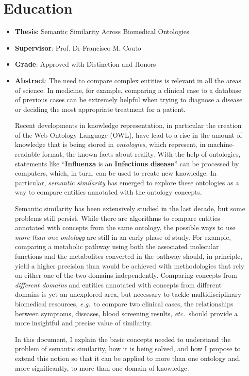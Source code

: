 \section{Education} \label{sec:education}

\begin{itemize}
  \item \textbf{Thesis}: Semantic Similarity Across Biomedical Ontologies
  \item \textbf{Supervisor}: Prof. Dr Francisco M. Couto
  \item \textbf{Grade}: Approved with Distinction and Honors
  \item \textbf{Abstract}: The need to compare complex entities is relevant in all the areas of science. In medicine, for example, comparing a clinical case to a database of previous cases can be extremely helpful when trying to diagnose a disease or deciding the most appropriate treatment for a patient.
  
  \hskip20pt Recent developments in knowledge representation, in particular the creation of the Web Ontology Language (OWL), have lead to a rise in the amount of knowledge that is being stored in \emph{ontologies}, which represent, in machine-readable format, the known facts about reality. With the help of ontologies, statements like ``\textbf{Influenza} is an \textbf{Infectious disease}'' can be processed by computers, which, in turn, can be used to create new knowledge. In particular, \emph{semantic similarity} has emerged to explore these ontologies as a way to compare entities annotated with the ontology concepts.
  
  \hskip20pt Semantic similarity has been extensively studied in the last decade, but some problems still persist. While there are algorithms to compare entities annotated with concepts from the same ontology, the possible ways to use \emph{more than one ontology} are still in an early phase of study. For example, comparing a metabolic pathway using both the associated molecular functions and the metabolites converted in the pathway should, in principle, yield a higher precision than would be achieved with methodologies that rely on either one of the two domains independently. Comparing concepts from \emph{different domains} and entities annotated with concepts from different domains is yet an unexplored area, but necessary to tackle multidisciplinary biomedical resources, \emph{e.g.}~to compare two clinical cases, the relationships between symptoms, diseases, blood screening results, \emph{etc.}\ should provide a more insightful and precise value of similarity.
  
  \hskip20pt In this document, I explain the basic concepts needed to understand the problem of semantic similarity, how it is being solved, and how I propose to extend this notion so that it can be applied to more than one ontology and, more significantly, to more than one domain of knowledge.
\end{itemize}


